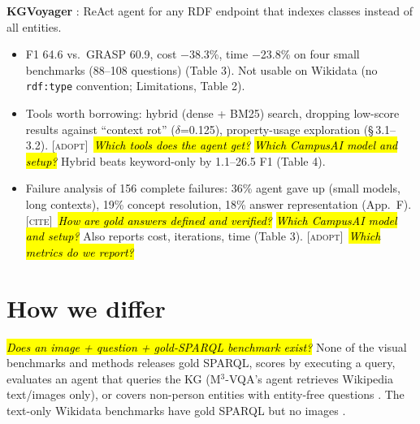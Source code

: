 \documentclass[10pt,a4paper]{article}
\newcommand{\adopt}{\textsc{[adopt]}}
\newcommand{\cit}{\textsc{[cite]}}
\newcommand{\q}[1]{\hl{\footnotesize\itshape #1}}
\begin{document}
\textbf{KGVoyager} \cite{wisam2026kgvoyager}: ReAct agent for any RDF
endpoint that indexes classes instead of all entities.
\begin{itemize}
  \item F1 64.6 vs.\ GRASP 60.9, cost $-$38.3\%, time $-$23.8\% on
    four small benchmarks (88--108 questions) (Table 3). Not usable
    on Wikidata (no \texttt{rdf:type} convention; Limitations, Table 2).
  \item Tools worth borrowing: hybrid (dense + BM25) search, dropping
    low-score results against ``context rot'' ($\delta$=0.125),
    property-usage exploration (\S\,3.1--3.2). \adopt\ \q{Which tools
    does the agent get?} \q{Which CampusAI model and setup?} Hybrid
    beats keyword-only by 1.1--26.5 F1 (Table 4).
  \item Failure analysis of 156 complete failures: 36\% agent gave up
    (small models, long contexts), 19\% concept resolution, 18\%
    answer representation (App.~F). \cit\ \q{How are gold answers
    defined and verified?} \q{Which CampusAI model and setup?} Also
    reports cost, iterations, time (Table 3). \adopt\ \q{Which
    metrics do we report?}
\end{itemize}

\section{How we differ}
\q{Does an image + question + gold-SPARQL benchmark exist?}
None of the visual benchmarks and methods releases gold SPARQL, scores by
executing a query, evaluates an agent that queries the KG
(M$^3$-VQA's agent retrieves Wikipedia text/images only), or covers
non-person entities with entity-free questions
\cite{chen2023can,mensink2023encyclopedic,ma2026m3,tran2025reasonvqa,hu2023open,shah2019kvqa,lee2025breaking,ma2026identifying,choi2025progressive,zhou2025seeing}.
The text-only Wikidata benchmarks have gold SPARQL but no images
\cite{loustaunau2025qawiki,walter2026grasp}.
\end{document}
